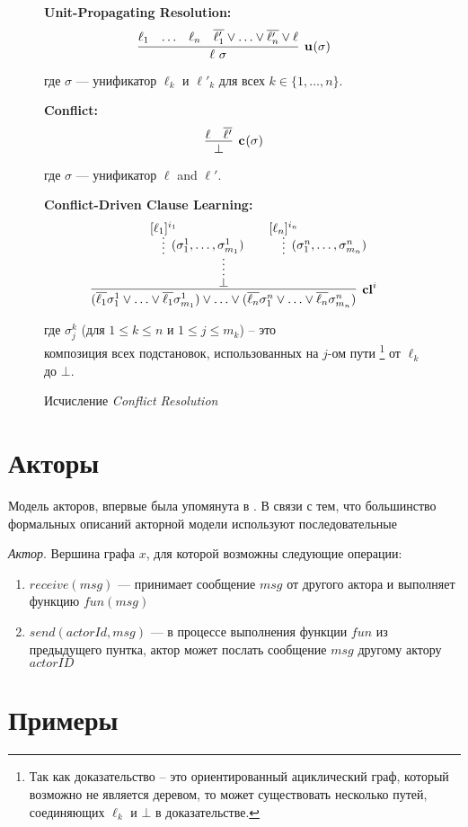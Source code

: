 \begin{figure}
\begin{calculus}
\centering
\textbf{Unit-Propagating Resolution:}
$$
\infer[\upr{}{\sigma}]
	  {\ell~\sigma}
      {\ell_1 & \ldots & \ell_n & \overline{\ell'_1} \vee \ldots \vee \overline{\ell'_n} \vee \ell}
$$

где $\sigma$ --- унификатор $\ell_k$ и $\ell'_k$ для всех $k \in \{1, \ldots, n \}$.

\bigskip

\textbf{Conflict:}
$$
\infer[\confl{}{\sigma}]
      {\bot}
      {\ell & \overline{\ell'}}
$$

где $\sigma$ --- унификатор $\ell$ and $\ell'$.

\bigskip

\textbf{Conflict-Driven Clause Learning:}
$$
\infer[\cdcl{}{i}]
      {(\overline{\ell_1} \sigma^1_1 \vee \ldots \vee \overline{\ell_1} \sigma^1_{m_1}) \vee \ldots \vee (\overline{\ell_n} \sigma^n_1 \vee \ldots \vee \overline{\ell_n} \sigma^n_{m_n})
      }
	  {\infer*{\bot}{\infer*[(\sigma_1^1,\ldots,\sigma_{m_1}^1)]{}{[\ell_1]^{\dls{i}{1}}} &  & \infer*[(\sigma_1^n,\ldots,\sigma_{m_n}^n)]{}{[\ell_n]^{\dls{i}{n}}}}
      }
$$

где $\sigma^k_j$ (для $1 \leq k \leq n$ и $1 \leq j \leq m_k$) -- это \\
композиция всех подстановок, использованных на $j$-ом пути \footnote{Так как
  доказательство -- это ориентированный ациклический граф, который возможно не
  является деревом, то может существовать несколько путей, соединяющих $\ell_k$ и
  $\bot$ в доказательстве.} от $\ell_k$ до $\bot$.

\end{calculus}
\caption{Исчисление \emph{Conflict Resolution}}
\label{fig:CR}
\end{figure}


\section{Акторы}

Модель акторов, впервые была упомянута в \cite{Hewitt:1973:UMA:1624775.1624804}. В связи с тем, что большинство формальных описаний акторной модели используют последовательные
\begin{definition}
  \emph{Актор}. Вершина графа $x$, для которой возможны следующие операции:
  \begin{enumerate}
  	\item $receive(msg)$ --- принимает сообщение $msg$ от другого актора и выполняет функцию $fun(msg)$
    \item $send(actorId, msg)$ --- в процессе выполнения функции $fun$ из предыдущего пунтка, актор может послать сообщение $msg$ другому актору $actorID$
  \end{enumerate}
\end{definition}


\section{Примеры}

